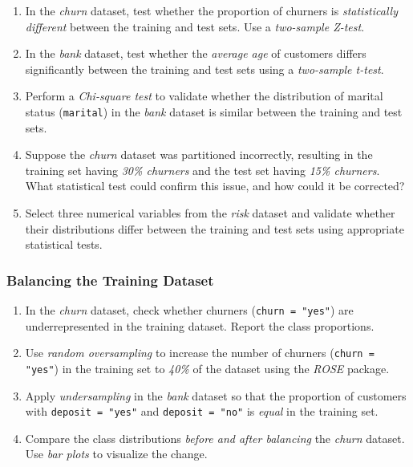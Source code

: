 \documentclass[
  11pt,
]{book}
\newcommand{\passthrough}[1]{#1}
\theoremstyle{definition}
\theoremstyle{definition}
\theoremstyle{definition}
\theoremstyle{definition}
\theoremstyle{remark}
\begin{document}
\begin{enumerate}
\def\labelenumi{\arabic{enumi}.}
\setcounter{enumi}{19}
\item
  In the \emph{churn} dataset, test whether the proportion of churners is \emph{statistically different} between the training and test sets. Use a \emph{two-sample Z-test}.
\item
  In the \emph{bank} dataset, test whether the \emph{average age} of customers differs significantly between the training and test sets using a \emph{two-sample t-test}.
\item
  Perform a \emph{Chi-square test} to validate whether the distribution of marital status (\passthrough{\lstinline!marital!}) in the \emph{bank} dataset is similar between the training and test sets.
\item
  Suppose the \emph{churn} dataset was partitioned incorrectly, resulting in the training set having \emph{30\% churners} and the test set having \emph{15\% churners}. What statistical test could confirm this issue, and how could it be corrected?
\item
  Select three numerical variables from the \emph{risk} dataset and validate whether their distributions differ between the training and test sets using appropriate statistical tests.
\end{enumerate}

\subsubsection*{Balancing the Training Dataset}\label{balancing-the-training-dataset-1}


\begin{enumerate}
\def\labelenumi{\arabic{enumi}.}
\setcounter{enumi}{24}
\item
  In the \emph{churn} dataset, check whether churners (\passthrough{\lstinline!churn = "yes"!}) are underrepresented in the training dataset. Report the class proportions.
\item
  Use \emph{random oversampling} to increase the number of churners (\passthrough{\lstinline!churn = "yes"!}) in the training set to \emph{40\%} of the dataset using the \emph{ROSE} package.
\item
  Apply \emph{undersampling} in the \emph{bank} dataset so that the proportion of customers with \passthrough{\lstinline!deposit = "yes"!} and \passthrough{\lstinline!deposit = "no"!} is \emph{equal} in the training set.
\item
  Compare the class distributions \emph{before and after balancing} the \emph{churn} dataset. Use \emph{bar plots} to visualize the change.
\end{enumerate}
\end{document}
